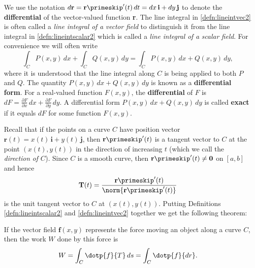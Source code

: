 We use the notation $d\textbf{r} = \textbf{r}\primeskip'(t)\,dt = dx\,\textbf{i} + dy\,\textbf{j}$ to denote the \textbf{differential} of the vector-valued function \textbf{r}. The line integral in \autoref{defn:lineintvec2} is often called a \emph{line integral of a vector field} to distinguish it from the line integral in \autoref{defn:lineintscalar2} which is called a \emph{line integral of a scalar field}. For convenience we will often write
\[\int_C P(x,y)\,dx + \int_C Q(x,y)\,dy = \int_C P(x,y)\,dx + Q(x,y)\,dy ,\]
where it is understood that the line integral along $C$ is being applied to both $P$ and $Q$. The quantity $P(x,y)\,dx + Q(x,y)\,dy$ is known as a \textbf{differential form}. For a real-valued function $F(x,y)$, the \textbf{differential} of $F$ is $dF = \frac{\partial F}{\partial x}\,dx + \frac{\partial F}{\partial y}\,dy$. A differential form $P(x,y)\,dx + Q(x,y)\,dy$ is called \textbf{exact} if it equals $dF$ for some function $F(x,y)$.

Recall that if the points on a curve $C$ have position vector $\textbf{r}(t) = x(t)\,\textbf{i} + y(t)\,\textbf{j}$, then $\textbf{r}\primeskip'(t)$ is a tangent vector to $C$ at the point $(x(t),y(t))$ in the direction of increasing $t$ (which we call the \emph{direction of $C$}). Since $C$ is a smooth curve, then $\textbf{r}\primeskip'(t) \ne \textbf{0}$ on $[a,b]$ and hence
\[\textbf{T}(t) = \frac{\textbf{r}\primeskip'(t)}{\norm{\textbf{r}\primeskip'(t)}}\]
is the unit tangent vector to $C$ at $(x(t),y(t))$. Putting Definitions \ref{defn:lineintscalar2} and \ref{defn:lineintvec2} together we get the following theorem:


If the vector field $\textbf{f}(x,y)$ represents the force moving an object along a curve $C$, then the work $W$ done by this force is
\[
 W = \int_C \dotp{f}{T}\,ds
 = \int_C \dotp{f}{dr} .
\]

